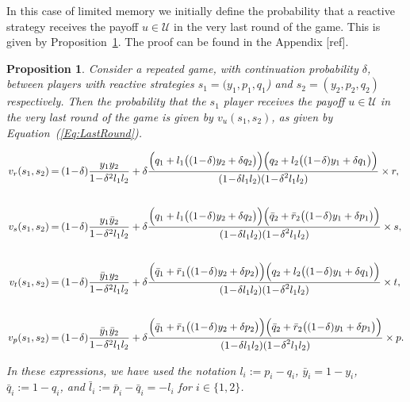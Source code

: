 \documentclass[11pt]{article}
\theoremstyle{plainCl1}
\newtheorem{Prop}{Proposition}
\theoremstyle{plainCl2}
\begin{document}
In this case of limited memory we initially define the probability that a
reactive strategy receives the payoff $u\!\in\! \mathcal{U}$ in the very last
round of the game. This is given by Proposition~\ref{proposition:last_round}.
The proof can be found in the Appendix [ref].

\begin{Prop}\label{proposition:last_round} Consider a repeated game, with
    continuation probability $\delta$, between players with reactive strategies
    $s_1\!=\!(y_1, p_1, q_1$)  and $s_2\!=\!(y_2,p_2,q_2)$ respectively. Then
    the probability that the $s_1$ player receives the payoff $u\!\in\!
    \mathcal{U}$ in the very last round of the game is given by
    $v_{u}(s_1,s_2)$, as given by Equation~(\ref{Eq:LastRound}).

    \begin{equation} \label{Eq:LastRound}
      \setlength{\arraycolsep}{1pt}
      \begin{array}{rcl}
    
      v_{r}(s_1,s_2) &= &\displaystyle (1\!-\!\delta)\frac{y_1y_2}{1\!-\!\delta^2 l_1 l_2}+\delta \frac{\Big(q_1+l_1\big((1\!-\!\delta)y_2+\delta q_2\big)\Big) \Big(q_2+l_2\big((1\!-\!\delta)y_1+\delta q_1\big)\Big)}
      {\displaystyle(1\!-\!\delta l_1l_2)(1\!-\!\delta^2 l_1 l_2)} \times r,\\[1cm]
    
      v_{s}(s_1,s_2) &= &\displaystyle (1\!-\!\delta)\frac{y_1\bar{y}_2}{1\!-\!\delta^2 l_1 l_2}+\delta \frac{\Big(q_1+l_1\big((1\!-\!\delta)y_2+\delta q_2\big)\Big) \Big(\bar{q}_2+\bar{r}_2\big((1\!-\!\delta)y_1+\delta p_1\big)\Big)}
      {\displaystyle(1\!-\!\delta l_1l_2)(1\!-\!\delta^2 l_1 l_2)} \times s,\\[1cm]
    
      v_{t}(s_1,s_2) &= &\displaystyle (1\!-\!\delta)\frac{\bar{y}_1y_2}{1\!-\!\delta^2 l_1 l_2}+\delta \frac{\Big(\bar{q}_1+\bar{r}_1\big((1\!-\!\delta)y_2+\delta p_2\big)\Big) \Big(q_2+l_2\big((1\!-\!\delta)y_1+\delta q_1\big)\Big)}
      {\displaystyle(1\!-\!\delta l_1l_2)(1\!-\!\delta^2 l_1 l_2)} \times t,\\[1cm]
    
      v_{p}(s_1,s_2) &= &\displaystyle (1\!-\!\delta)\frac{\bar{y}_1\bar{y}_2}{1\!-\!\delta^2 l_1 l_2}+\delta \frac{\Big(\bar{q}_1+\bar{r}_1\big((1\!-\!\delta)y_2+\delta p_2\big)\Big) \Big(\bar{q}_2+\bar{r}_2\big((1\!-\!\delta)y_1+\delta p_1\big)\Big)}
      {\displaystyle(1\!-\!\delta l_1l_2)(1\!-\!\delta^2 l_1 l_2)} \times p.
      \end{array}
    \end{equation}

In these expressions, we have used the notation $l_i:=p_i\!-\!q_i$,
$\bar{y}_i\!=\!1\!-\!y_i$, $\bar{q}_i:=1\!-\!q_i$, and
$\bar{l}_i:=\bar{p}_i\!-\!\bar{q}_i=-l_i$ for $i\!\in\!\{1,2\}$.
\end{Prop}
\end{document}
